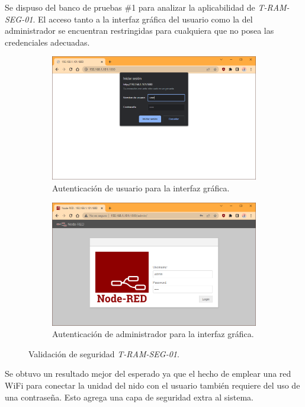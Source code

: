 
Se dispuso del banco de pruebas \#1 para analizar la aplicabilidad de \textit{T-RAM-SEG-01}. El acceso tanto a la interfaz gráfica del usuario como la del administrador se encuentran restringidas para cualquiera que no posea las credenciales adecuadas.
\begin{figure}[H]
\centering
    	\begin{subfigure}{0.49\textwidth}
        	\centering
        	\includegraphics[width=\linewidth]{ImagenesValidacion del prototipo/t-ram-seg-01-1}		
			\caption{Autenticación de usuario para la interfaz gráfica.}
        \end{subfigure}\hfill
        \begin{subfigure}{0.49\textwidth}
        	\centering
        	\includegraphics[width=\linewidth]{ImagenesValidacion del prototipo/t-ram-seg-01-2}
        	\caption{Autenticación de administrador para la interfaz gráfica.}
        \end{subfigure}
	\caption{Validación de seguridad \textit{T-RAM-SEG-01}.}
\end{figure}

Se obtuvo un resultado mejor del esperado ya que el hecho de emplear una red WiFi para conectar la unidad del nido con el usuario también requiere del uso de una contraseña. Esto agrega una capa de seguridad extra al sistema.
